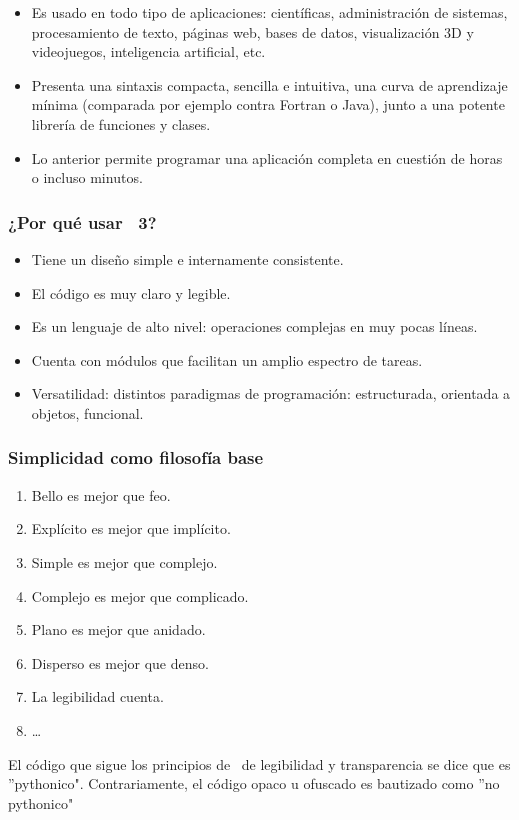 \begin{frame}
\begin{uncoverenv}
\begin{itemize}[<+->]
\item Es usado en todo tipo de aplicaciones: científicas, administración de sistemas, procesamiento de texto, páginas web, bases de datos, visualización 3D y videojuegos, inteligencia artificial, etc.
\item Presenta una sintaxis compacta, sencilla e intuitiva, una curva de aprendizaje mínima (comparada por ejemplo contra Fortran o Java), junto a una potente librería de funciones y clases.
\item Lo anterior permite programar una aplicación completa en cuestión de horas o incluso minutos.
\end{itemize}
\end{uncoverenv}
\end{frame}
\begin{frame}
\frametitle{¿Por qué usar \python\ 3?}
\begin{itemize}[<+->]
\item Tiene un diseño simple e internamente consistente.
\item El código es muy claro y legible.
\item Es un lenguaje de alto nivel: operaciones complejas en muy pocas líneas.
\item Cuenta con módulos que facilitan un amplio espectro de tareas.
\item Versatilidad: distintos paradigmas de programación: estructurada, orientada a objetos, funcional.
\end{itemize}
\end{frame}
\begin{frame}
\frametitle{Simplicidad como filosofía base}
\begin{enumerate}
\item Bello es mejor que feo.
\item Explícito es mejor que implícito.
\item Simple es mejor que complejo.
\item Complejo es mejor que complicado.
\item Plano es mejor que anidado.
\item Disperso es mejor que denso.
\item La legibilidad cuenta.
\item \ldots
\end{enumerate}
El código que sigue los principios de \python\ de legibilidad y transparencia se dice que es ''pythonico". Contrariamente, el código opaco u ofuscado es bautizado como ''no pythonico" %
\end{frame}
